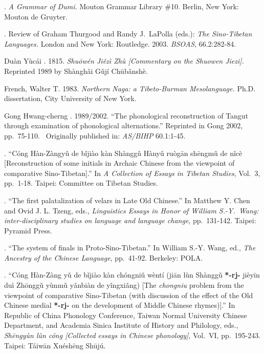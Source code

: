 .
\textit{A Grammar of Dumi.}
Mouton Grammar Library \#10.  Berlin, New York: Mouton de Gruyter.

.
Review of Graham Thurgood and Randy J.\ LaPolla (eds.): \textit{The Sino-Tibetan Languages.} London and New York: Routledge. 2003.
\textit{BSOAS}, 66.2:282-84.

Duàn Yùcái .
1815.
 \textit{Shuōwén Jiězì Zhù [Commentary on the Shuowen Jiezi].}
Reprinted 1989 by Shànghǎi Gǔjí Chūbǎnshè.

French, Walter T.
1983.
\textit{Northern Naga: a Tibeto-Burman Mesolanguage.}
Ph.D. dissertation, City University of New York.

Gong Hwang-cherng .
1989/2002.
“The phonological reconstruction of Tangut through examination of phonological alternations.”
Reprinted in Gong 2002, pp.\ 75-110.  Originally published in: \textit{AS/BIHP} 60.1:1-45.

.
 “Cóng Hàn-Zàngyǔ de bǐjiào kàn Shànggǔ Hànyǔ ruògān shēngmǔ de nǐcè [Reconstruction of some initials in Archaic Chinese from the viewpoint of comparative Sino-Tibetan].”
In \textit{A Collection of Essays in Tibetan Studies}, Vol.~3, pp.\ 1-18. Taipei: Committee on Tibetan Studies.

.
“The ﬁrst palatalization of velars in Late Old Chinese.”
In Matthew Y. Chen and Ovid J. L. Tzeng, eds., \textit{Linguistics Essays in Honor of William S.-Y.~Wang: inter-disciplinary studies on language and language change}, pp.\ 131-142. Taipei: Pyramid Press.

.
“The system of ﬁnals in Proto-Sino-Tibetan.” 
In William S.-Y. Wang, ed., \textit{The Ancestry of the Chinese Language}, pp.\ 41-92. Berkeley: POLA.

{}.
 “Cóng Hàn-Zàng yǔ de bǐjiào kàn chóngniǔ wèntí (jiān lùn Shànggǔ \textbf{*-rj-} jièyīn duì Zhōnggǔ yùnmǔ yǎnbiàn de yǐngxiǎng) [The \textit{chongniu} problem from the viewpoint of comparative Sino-Tibetan (with discussion of the effect of the Old Chinese medial \textbf{*-rj-} on the development of Middle Chinese rhymes)].”
In Republic of China Phonology Conference, Taiwan Normal University Chinese Department, and Academia Sinica Institute of History and Philology, eds.,  \textit{Shēngyùn lùn cóng [Collected essays in Chinese phonology]}, Vol.~VI, pp.\ 195-243. Taipei:  Táiwān Xuéshēng Shūjú.

